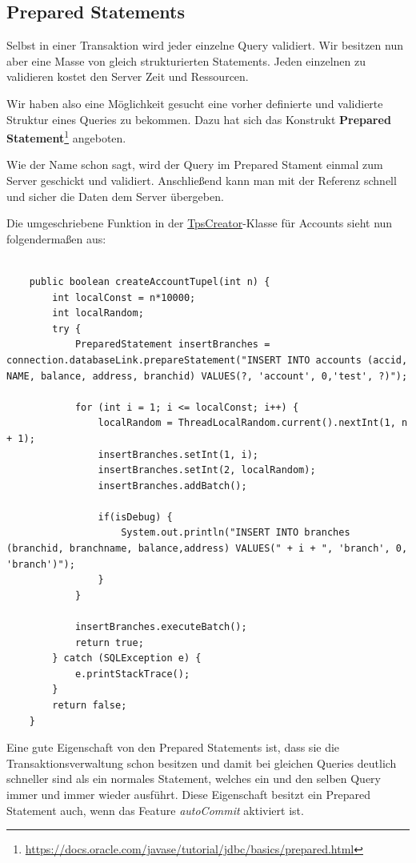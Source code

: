\subsection{Prepared Statements}
Selbst in einer Transaktion wird jeder einzelne Query validiert. Wir besitzen
nun aber eine Masse von gleich strukturierten Statements. Jeden einzelnen zu
validieren kostet den Server Zeit und Ressourcen.
 
Wir haben also eine Möglichkeit gesucht eine vorher definierte und validierte
Struktur eines Queries zu bekommen. Dazu hat sich das Konstrukt 
\textbf{Prepared Statement}\footnote{\url{https://docs.oracle.com/javase/tutorial/jdbc/basics/prepared.html}} angeboten.
 
Wie der Name schon sagt, wird der Query im Prepared Stament einmal zum Server
geschickt und validiert. Anschließend kann man mit der Referenz
schnell und sicher die Daten dem Server übergeben.
 
Die umgeschriebene Funktion in der \hyperref[lst:tpsv2]{TpsCreator}-Klasse für
Accounts sieht nun folgendermaßen aus:
 \begin{lstlisting}[caption={Einbinden von Prepared Statements}]

	public boolean createAccountTupel(int n) {
		int localConst = n*10000;
		int localRandom;		
		try {
			PreparedStatement insertBranches = connection.databaseLink.prepareStatement("INSERT INTO accounts (accid, NAME, balance, address, branchid) VALUES(?, 'account', 0,'test', ?)");
			
			for (int i = 1; i <= localConst; i++) {
				localRandom = ThreadLocalRandom.current().nextInt(1, n + 1);
				insertBranches.setInt(1, i);
				insertBranches.setInt(2, localRandom);
				insertBranches.addBatch();
				
				if(isDebug) {
					System.out.println("INSERT INTO branches (branchid, branchname, balance,address) VALUES(" + i + ", 'branch', 0, 'branch')");
				}
			}

			insertBranches.executeBatch();
			return true;
		} catch (SQLException e) {
			e.printStackTrace();
		}
		return false;
	}
 \end{lstlisting}

Eine gute Eigenschaft von den Prepared Statements ist, dass sie die
Transaktionsverwaltung schon besitzen und damit bei gleichen Queries
deutlich schneller sind als ein normales Statement, welches ein und den selben
Query immer und immer wieder ausführt. Diese Eigenschaft besitzt ein
Prepared Statement auch, wenn das Feature \textit{autoCommit} aktiviert ist.

